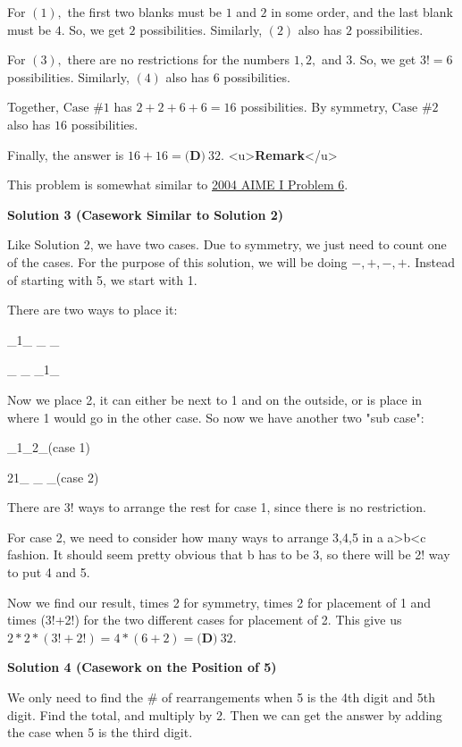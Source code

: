 \begin{enumerate}
 For $(1),$ the first two blanks must be $1$ and $2$ in some order, and the last blank must be $4.$ So, we get $2$ possibilities. Similarly, $(2)$ also has $2$ possibilities.

 For $(3),$ there are no restrictions for the numbers $1, 2,$ and $3.$ So, we get $3!=6$ possibilities. Similarly, $(4)$ also has $6$ possibilities.

 Together, $\text{Case \#1}$ has $2+2+6+6=16$ possibilities. By symmetry, $\text{Case \#2}$ also has $16$ possibilities. 

 Finally, the answer is $16+16=\boxed{\textbf{(D)} ~32}.$
<u>\textbf{Remark}</u>

 This problem is somewhat similar to \href{https://artofproblemsolving.com/wiki/index.php?title=2004\_AIME\_I\_Problems/Problem\_6}{2004 AIME I Problem 6}.

 



\textbf{Solution 3 (Casework Similar to Solution 2)}

Like Solution 2, we have two cases. Due to symmetry, we just need to count one of the cases. For the purpose of this solution, we will be doing $-,+,-,+$. Instead of starting with 5, we start with 1.

 There are two ways to place it:

 \_1\_ \_ \_

 \_ \_ \_1\_

 Now we place 2, it can either be next to 1 and on the outside, or is place in where 1 would go in the other case. So now we have another two "sub case":

 \_1\_2\_(case 1)

 21\_ \_ \_(case 2)

 There are 3! ways to arrange the rest for case 1, since there is no restriction.

 For case 2, we need to consider how many ways to arrange 3,4,5 in a a>b<c fashion. It should seem pretty obvious that b has to be 3, so there will be 2! way to put 4 and 5.

 Now we find our result, times 2 for symmetry, times 2 for placement of 1 and times (3!+2!) for the two different cases for placement of 2. This give us $2*2*(3!+2!)=4*(6+2)=\boxed{\textbf{(D)} ~32}$.

 



\textbf{Solution 4 (Casework on the Position of 5)}

We only need to find the \# of rearrangements when 5 is the 4th digit and 5th digit. Find the total, and multiply by 2. Then we can get the answer by adding the case when 5 is the third digit.


\end{enumerate}
